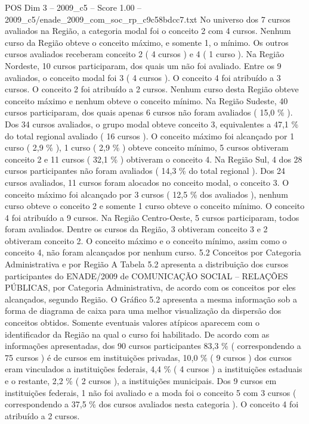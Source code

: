 \begin{textsample}{POS Dim 3 – 2009\_c5 – Score 1.00 – 2009\_c5/enade\_2009\_com\_soc\_rp\_c9c58bdcc7.txt}
No universo dos 7 cursos avaliados na Região, a categoria modal foi o conceito 2 com 4 cursos.
Nenhum curso da Região obteve o conceito máximo, e somente 1, o mínimo.
Os outros cursos avaliados receberam conceito 2 ( 4 cursos ) e 4 ( 1 curso ).
Na Região Nordeste, 10 cursos participaram, dos quais um não foi avaliado.
Entre os 9 avaliados, o conceito modal foi 3 ( 4 cursos ).
O conceito 4 foi atribuído a 3 cursos.
O conceito 2 foi atribuído a 2 cursos.
Nenhum curso desta Região obteve conceito máximo e nenhum obteve o conceito mínimo.
Na Região Sudeste, 40 cursos participaram, dos quais apenas 6 cursos não foram avaliados ( 15,0 \% ).
Dos 34 cursos avaliados, o grupo modal obteve conceito 3, equivalentes a 47,1 \% do total regional avaliado ( 16 cursos ).
O conceito máximo foi alcançado por 1 curso ( 2,9 \% ), 1 curso ( 2,9 \% ) obteve conceito mínimo, 5 cursos obtiveram conceito 2 e 11 cursos ( 32,1 \% ) obtiveram o conceito 4.
Na Região Sul, 4 dos 28 cursos participantes não foram avaliados ( 14,3 \% do total regional ).
Dos 24 cursos avaliados, 11 cursos foram alocados no conceito modal, o conceito 3.
O conceito máximo foi alcançado por 3 cursos ( 12,5 \% dos avaliados ), nenhum curso obteve o conceito 2 e somente 1 curso obteve o conceito mínimo.
O conceito 4 foi atribuído a 9 cursos.
Na Região Centro-Oeste, 5 cursos participaram, todos foram avaliados.
Dentre os cursos da Região, 3 obtiveram conceito 3 e 2 obtiveram conceito 2.
O conceito máximo e o conceito mínimo, assim como o conceito 4, não foram alcançados por nenhum curso. 5.2 Conceitos por Categoria Administrativa e por Região A Tabela 5.2 apresenta a distribuição dos cursos participantes do ENADE/2009 de COMUNICAÇÃO SOCIAL – RELAÇÕES PÚBLICAS, por Categoria Administrativa, de acordo com os conceitos por eles alcançados, segundo Região.
O Gráfico 5.2 apresenta a mesma informação sob a forma de diagrama de caixa para uma melhor visualização da dispersão dos conceitos obtidos.
Somente eventuais valores atípicos aparecem com o identificador da Região na qual o curso foi habilitado.
De acordo com as informações apresentadas, dos 90 cursos participantes 83,3 \% ( correspondendo a 75 cursos ) é de cursos em instituições privadas, 10,0 \% ( 9 cursos ) dos cursos eram vinculados a instituições federais, 4,4 \% ( 4 cursos ) a instituições estaduais e o restante, 2,2 \% ( 2 cursos ), a instituições municipais.
Dos 9 cursos em instituições federais, 1 não foi avaliado e a moda foi o conceito 5 com 3 cursos ( correspondendo a 37,5 \% dos cursos avaliados nesta categoria ).
O conceito 4 foi atribuído a 2 cursos.

\end{textsample}
